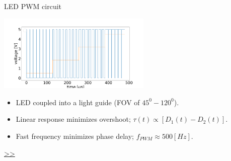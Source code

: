 \documentclass{beamer}
\begin{document}
\begin{frame}{\hypertarget{frame:LED PWM circuit}{LED PWM circuit}}

	\begin{center}		
		\includegraphics[width=0.55\textwidth,keepaspectratio]{duty_cycle.png}
	\end{center}
	\begin{itemize}		
		\item LED coupled into a light guide (FOV of $45^0-120^0$).
		\item Linear response minimizes overshoot; $\tau(t)  \propto [D_1(t) -D_2(t)] $.
		\item Fast frequency minimizes phase delay; $f_{PWM} \approx 500[Hz]$.
		
	\end{itemize}
	\hyperlink{frame:LED PWM circuit 1}{>>} 
\end{frame}
\end{document}
